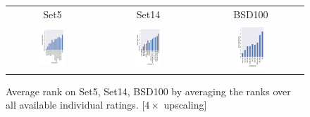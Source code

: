 \documentclass[10pt,twocolumn,letterpaper]{article}
\begin{document}
\begin{figure}[h!]
  	\begin{tabular}{ccc}
  		 Set5 & Set14 & BSD100 \\
     	\includegraphics[width=0.3\textwidth]{images/used/appendix/jpg/MOS/Ranks_Set5}&
     	\includegraphics[width=0.3\textwidth]{images/used/appendix/jpg/MOS/Ranks_Set14} &
     	\includegraphics[width=0.3\textwidth]{images/used/appendix/jpg/MOS/Ranks_BSD100} \\
     \end{tabular}
     \caption{Average rank on Set5, Set14, BSD100 by averaging the ranks over all available individual ratings. [$4\times$ upscaling]}
     \label{fig:app_mosrank}
\end{figure}
\clearpage
\end{document}
